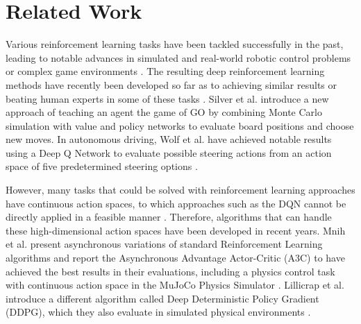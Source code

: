 \documentclass[letterpaper, 10 pt, conference]{ieeeconf}  %
\begin{document}

\section{Related Work}


Various reinforcement learning tasks have been tackled successfully in the past, leading to notable advances in simulated and real-world robotic control problems \cite{Levine:2013:GPS:3042817.3042937}\cite{Bruin2015TheIO} or complex game environments \cite{Schaul2015PrioritizedER}. The resulting deep reinforcement learning methods have recently been developed so far as to achieving similar results or beating human experts in some of these tasks \cite{44806}\cite{mnih2015humanlevel}. Silver et al. introduce a new approach of teaching an agent the game of GO by combining Monte Carlo simulation with value and policy networks to evaluate board positions and choose new moves. In autonomous driving, Wolf et al. have achieved notable results using a Deep Q Network to evaluate possible steering actions from an action space of five predetermined steering options \cite{7995727}. 

However, many tasks that could be solved with reinforcement learning approaches have continuous action spaces, to which approaches such as the DQN cannot be directly applied in a feasible manner \cite{lillicrapContinuousControlDeep2015}. Therefore, algorithms that can handle these high-dimensional action spaces have been developed in recent years. Mnih et al. present asynchronous variations of standard Reinforcement Learning algorithms and report the Asynchronous Advantage Actor-Critic (A3C) to have achieved the best results in their evaluations, including a physics control task with continuous action space in the MuJoCo Physics Simulator \cite{mnihAsynchronousMethodsDeep2016}. Lillicrap et al. introduce a different algorithm called Deep Deterministic Policy Gradient (DDPG), which they also evaluate in simulated physical environments \cite{mnih2013playing}.
\end{document}
